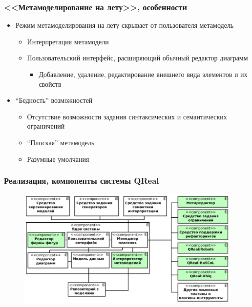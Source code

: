 \documentclass[14pt]{beamer}
\begin{document}
\begin{frame}
    \frametitle{<<Метамоделирование на лету>>, особенности}
    \begin{itemize}
        \item Режим метамоделирования на лету скрывает от пользователя метамодель
        \begin{itemize}
            \item Интерпретация метамодели
            \item Пользовательский интерфейс, расширяющий обычный редактор диаграмм
            \begin{itemize}
                \item Добавление, удаление, редактирование внешнего вида элементов и их свойств
            \end{itemize}
        \end{itemize}
        \item ``Бедность'' возможностей
        \begin{itemize}
            \item Отсутствие возможности задания синтаксических и семантических ограничений
            \item ``Плоская'' метамодель
            \item Разумные умолчания
        \end{itemize}        
    \end{itemize}
\end{frame}

\begin{frame}
    \frametitle{Реализация, компоненты системы QReal}
    \begin{figure}
        \begin{center}
      		\includegraphics[width=\textwidth]{images/presentation/components.png}
        \end{center}
    \end{figure}
\end{frame}
\end{document}

